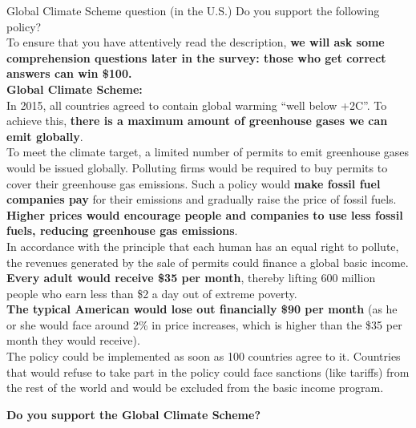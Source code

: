 \documentclass[aspectratio=169,xcolor=dvipsnames, 11pt,mathserif]{beamer}
\begin{document}
\begin{frame}{Global Climate Scheme question (in the U.S.)\label{gcs_question} \hyperlink{cs}{}}
  \footnotesize
  Do you support the following policy?\\
  
  To ensure that you have attentively read the description, \textbf{we will ask some comprehension questions later in the survey: those who get correct answers can win \$100.}\\ 
  
\vspace{.2cm}
  \textbf{Global Climate Scheme:} \\ 

\vspace{.2cm}
  In 2015, all countries agreed to contain global warming ``well below +2\textdegree{}C''. To achieve this, \textbf{there is a maximum amount of greenhouse gases we can emit globally}. \\ 

\vspace{.2cm}
  To meet the climate target, a limited number of permits to emit greenhouse gases would be issued globally. Polluting firms would be required to buy permits to cover their greenhouse gas emissions. Such a policy would \textbf{make fossil fuel companies pay} for their emissions and gradually raise the price of fossil fuels. \textbf{Higher prices would encourage people and companies to use less fossil fuels, reducing greenhouse gas emissions}. \\ 

\vspace{.2cm}
  In accordance with the principle that each human has an equal right to pollute, the revenues generated by the sale of permits could finance a global basic income. \textbf{Every adult would receive \$35 per month}, thereby lifting 600 million people who earn less than \$2 a day out of extreme poverty.\\ 

  \textbf{The typical American would lose out financially \$90  per month} (as he or she would face around 2\% in price increases, which is higher than the \$35 per month they would receive).\\ 

\vspace{.2cm}
  The policy could be implemented as soon as 100 countries agree to it. Countries that would refuse to take part in the policy could face sanctions (like tariffs) from the rest of the world and would be excluded from the basic income program.\\ 
\vspace{.2cm}

  \textbf{Do you support the Global Climate Scheme?}
\end{frame}
  
\end{document}
